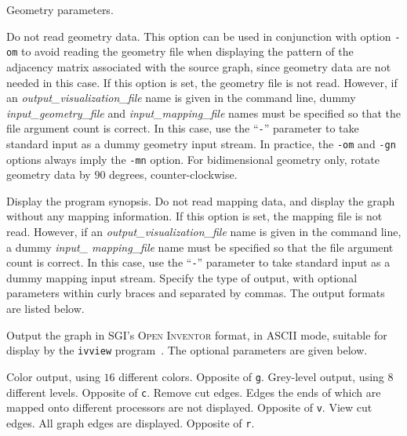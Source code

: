\begin{itemize}
\progopt
\begin{itemize}
Geometry parameters.
\begin{itemize}
\iteme[\texttt{n}]
Do not read geometry data. This option can be used in conjunction with
option \texttt{-om} to avoid reading the geometry file when displaying
the pattern of the adjacency matrix associated with the source graph,
since geometry data are not needed in this case.
If this option is set, the geometry file is not read. However, if an
{\it output\_\lbt visualization\_\lbt file} name is given in the
command line, dummy {\it input\_\lbt geometry\_\lbt file\/} and {\it
input\_\lbt mapping\_\lbt file\/} names must be specified so that the
file argument count is correct. In this case, use the ``\texttt{-}''
parameter to take standard input as a dummy geometry input stream.  In
practice, the \texttt{-om} and \texttt{-gn} options always imply the
\texttt{-mn} option.
\iteme[\texttt{r}]
For bidimensional geometry only, rotate geometry data by $90$ degrees,
counter-clockwise.
\end{itemize}
\iteme[\texttt{-h}]
Display the program synopsis.
\iteme[\texttt{-mn}]
Do not read mapping data, and display the graph without any mapping
information. If this option is set, the mapping file is not
read. However, if an {\it output\_\lbt visualization\_\lbt file\/}
name is given in the command line, a dummy {\it input\_\lbt
mapping\_\lbt file\/} name must be specified so that the file argument
count is correct. In this case, use the ``\texttt{-}'' parameter to take
standard input as a dummy mapping input stream.
Specify the type of output, with optional parameters within curly braces
and separated by commas. The output formats are listed below.
\begin{itemize}
\iteme[\texttt{i}]
Output the graph in SGI's \textsc{Open Inventor} format, in ASCII mode,
suitable for display by the \texttt{ivview} program~\cite{oinv}. The
optional parameters are given below.
\begin{itemize}
\iteme[\texttt{c}]
Color output, using $16$ different colors. Opposite of \texttt{g}.
\iteme[\texttt{g}]
Grey-level output, using $8$ different levels. Opposite of \texttt{c}.
\iteme[\texttt{r}]
Remove cut edges. Edges the ends of which are mapped onto different
processors are not displayed. Opposite of \texttt{v}.
\iteme[\texttt{v}]
View cut edges. All graph edges are displayed.
Opposite of \texttt{r}.
\end{itemize}

\end{itemize}
\end{itemize}
\end{itemize}
